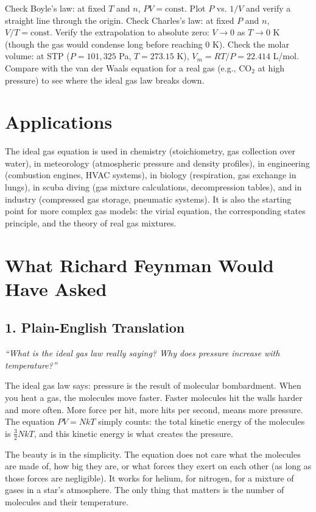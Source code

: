 Check Boyle's law: at fixed $T$ and $n$, $PV = \text{const}$. Plot $P$ vs. $1/V$ and verify a straight line through the origin. Check Charles's law: at fixed $P$ and $n$, $V/T = \text{const}$. Verify the extrapolation to absolute zero: $V \to 0$ as $T \to 0$ K (though the gas would condense long before reaching 0 K). Check the molar volume: at STP ($P = 101{,}325$ Pa, $T = 273.15$ K), $V_m = RT/P = 22.414$ L/mol. Compare with the van der Waals equation for a real gas (e.g., CO$_2$ at high pressure) to see where the ideal gas law breaks down.
\section*{Applications}

The ideal gas equation is used in chemistry (stoichiometry, gas collection over water), in meteorology (atmospheric pressure and density profiles), in engineering (combustion engines, HVAC systems), in biology (respiration, gas exchange in lungs), in scuba diving (gas mixture calculations, decompression tables), and in industry (compressed gas storage, pneumatic systems). It is also the starting point for more complex gas models: the virial equation, the corresponding states principle, and the theory of real gas mixtures.
\section*{What Richard Feynman Would Have Asked}

\subsection*{1. Plain-English Translation}
\textit{``What is the ideal gas law really saying? Why does pressure increase with temperature?''}

The ideal gas law says: pressure is the result of molecular bombardment. When you heat a gas, the molecules move faster. Faster molecules hit the walls harder and more often. More force per hit, more hits per second, means more pressure. The equation $PV = NkT$ simply counts: the total kinetic energy of the molecules is $\frac{3}{2}NkT$, and this kinetic energy is what creates the pressure.

The beauty is in the simplicity. The equation does not care what the molecules are made of, how big they are, or what forces they exert on each other (as long as those forces are negligible). It works for helium, for nitrogen, for a mixture of gases in a star's atmosphere. The only thing that matters is the number of molecules and their temperature.

